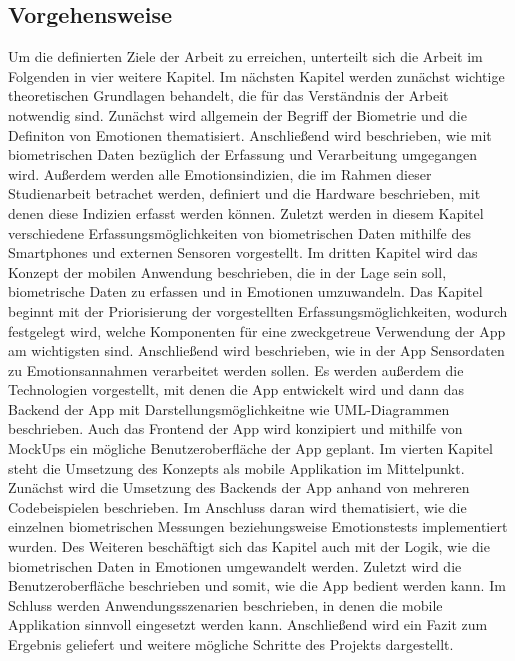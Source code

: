 \subsection{Vorgehensweise}
Um die definierten Ziele der Arbeit zu erreichen, unterteilt sich die Arbeit im Folgenden in vier weitere Kapitel. \newline
Im nächsten Kapitel werden zunächst wichtige theoretischen Grundlagen behandelt, die für das Verständnis der Arbeit notwendig sind. Zunächst wird allgemein der Begriff der Biometrie und die Definiton von Emotionen thematisiert. Anschließend wird beschrieben, wie mit biometrischen Daten bezüglich der Erfassung und Verarbeitung umgegangen wird. Außerdem werden alle Emotionsindizien, die im Rahmen dieser Studienarbeit betrachet werden, definiert und die Hardware beschrieben, mit denen diese Indizien erfasst werden können. Zuletzt werden in diesem Kapitel verschiedene Erfassungsmöglichkeiten von biometrischen Daten mithilfe des Smartphones und externen Sensoren vorgestellt. \newline
Im dritten Kapitel wird das Konzept der mobilen Anwendung beschrieben, die in der Lage sein soll, biometrische Daten zu erfassen und in Emotionen umzuwandeln. Das Kapitel beginnt mit der Priorisierung der vorgestellten Erfassungsmöglichkeiten, wodurch festgelegt wird, welche Komponenten für eine zweckgetreue Verwendung der App am wichtigsten sind. Anschließend wird beschrieben, wie in der App Sensordaten zu Emotionsannahmen verarbeitet werden sollen. Es werden außerdem die Technologien vorgestellt, mit denen die App entwickelt wird und dann das Backend der App mit Darstellungsmöglichkeitne wie UML-Diagrammen beschrieben. Auch das Frontend der App wird konzipiert und mithilfe von MockUps ein mögliche Benutzeroberfläche der App geplant. \newline
Im vierten Kapitel steht die Umsetzung des Konzepts als mobile Applikation im Mittelpunkt. Zunächst wird die Umsetzung des Backends der App anhand von mehreren Codebeispielen beschrieben. Im Anschluss daran wird thematisiert, wie die einzelnen biometrischen Messungen beziehungsweise Emotionstests implementiert wurden. Des Weiteren beschäftigt sich das Kapitel auch mit der Logik, wie die biometrischen Daten in Emotionen umgewandelt werden. Zuletzt wird die Benutzeroberfläche beschrieben und somit, wie die App bedient werden kann. \newline
Im Schluss werden Anwendungsszenarien beschrieben, in denen die mobile Applikation sinnvoll eingesetzt werden kann. Anschließend wird ein Fazit zum Ergebnis geliefert und weitere mögliche Schritte des Projekts dargestellt.